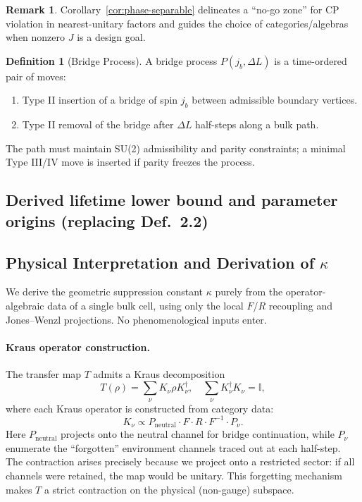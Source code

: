 \documentclass[11pt]{article}
\theoremstyle{plain}
\theoremstyle{definition}
\newtheorem{definition}[theorem]{Definition}
\newtheorem{remark}[theorem]{Remark}
\begin{document}
\begin{remark}
  Corollary~\ref{cor:phase-separable} delineates a ``no-go zone'' for CP violation in nearest-unitary factors and guides the choice of categories/algebras when nonzero $J$ is a design goal.
\end{remark}

\begin{definition}[Bridge Process]
  A bridge process $P(j_b, \Delta L)$ is a time-ordered pair of moves:
  \begin{enumerate}
    \item Type II insertion of a bridge of spin $j_b$ between admissible boundary vertices.
    \item Type II removal of the bridge after $\Delta L$ half-steps along a bulk path.
  \end{enumerate}
  The path must maintain SU(2) admissibility and parity constraints; a minimal Type III/IV move is inserted if parity freezes the process.
\end{definition}

\subsection*{Derived lifetime lower bound and parameter origins (replacing Def.~2.2)}

\subsection{Physical Interpretation and Derivation of $\kappa$}
\label{sec:kappa-phys}

We derive the geometric suppression constant $\kappa$ purely from the operator-algebraic data of a single bulk cell, using only the local $F$/$R$ recoupling and Jones--Wenzl projections. No phenomenological inputs enter.

\paragraph{Kraus operator construction.}
The transfer map $T$ admits a Kraus decomposition
\[
  T(\rho) = \sum_{\nu} K_\nu \rho K_\nu^\dagger, \quad \sum_\nu K_\nu^\dagger K_\nu = \mathbb{I},
\]
where each Kraus operator is constructed from category data:
\[
  K_\nu \propto P_{\text{neutral}} \cdot F \cdot R \cdot F^{-1} \cdot P_\nu.
\]
Here $P_{\text{neutral}}$ projects onto the neutral channel for bridge continuation, while $P_\nu$ enumerate the ``forgotten'' environment channels traced out at each half-step. The contraction arises precisely because we project onto a restricted sector: if all channels were retained, the map would be unitary. This forgetting mechanism makes $T$ a strict contraction on the physical (non-gauge) subspace.
\end{document}
